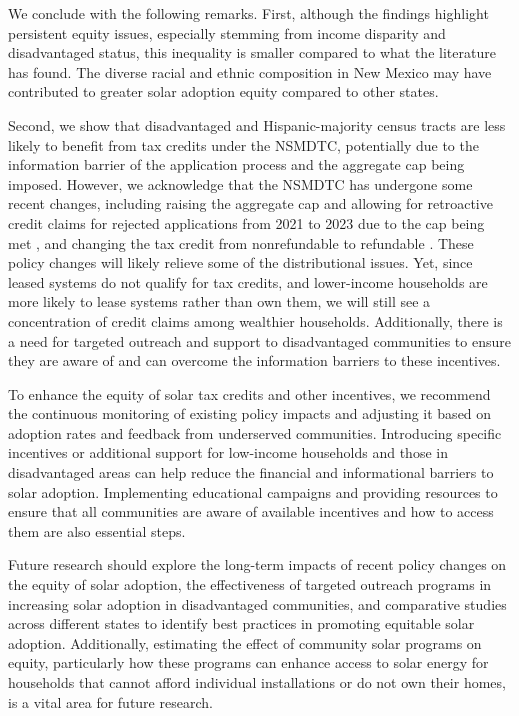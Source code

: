 \documentclass[11pt,twoside,letterpaper]{article}
\begin{document}
We conclude with the following remarks. First, although the findings highlight persistent equity issues, especially stemming from income disparity and disadvantaged status, this inequality is smaller compared to what the literature has found. The diverse racial and ethnic composition in New Mexico may have contributed to greater solar adoption equity compared to other states.

Second, we show that disadvantaged and Hispanic-majority census tracts are less likely to benefit from tax credits under the NSMDTC, potentially due to the information barrier of the application process and the aggregate cap being imposed. However, we acknowledge that the NSMDTC has undergone some recent changes, including raising the aggregate cap and allowing for retroactive credit claims for rejected applications from 2021 to 2023 due to the cap being met \parencite{newsolarcap}, and changing the tax credit from nonrefundable to refundable \parencite{nmsmdtc}. These policy changes will likely relieve some of the distributional issues. Yet, since leased systems do not qualify for tax credits, and lower-income households are more likely to lease systems rather than own them, we will still see a concentration of credit claims among wealthier households. Additionally, there is a need for targeted outreach and support to disadvantaged communities to ensure they are aware of and can overcome the information barriers to these incentives.

To enhance the equity of solar tax credits and other incentives, we recommend the continuous monitoring of existing policy impacts and adjusting it based on adoption rates and feedback from underserved communities. Introducing specific incentives or additional support for low-income households and those in disadvantaged areas can help reduce the financial and informational barriers to solar adoption. Implementing educational campaigns and providing resources to ensure that all communities are aware of available incentives and how to access them are also essential steps. 

Future research should explore the long-term impacts of recent policy changes on the equity of solar adoption, the effectiveness of targeted outreach programs in increasing solar adoption in disadvantaged communities, and comparative studies across different states to identify best practices in promoting equitable solar adoption. Additionally, estimating the effect of community solar programs on equity, particularly how these programs can enhance access to solar energy for households that cannot afford individual installations or do not own their homes, is a vital area for future research.
\end{document}
